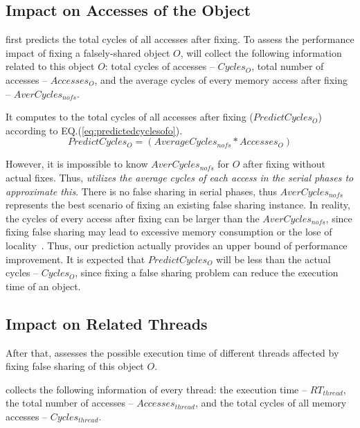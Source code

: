 \subsection{Impact on Accesses of the Object}
\label{sec:impactobject}

\cheetah{} first predicts the total cycles of all accesses after fixing. To assess the performance impact of fixing a falsely-shared object $O$, \cheetah{} will collect the following information related to this object $O$:  total cycles of accesses -- $Cycles_O$, total number of accesses -- $Accesses_O$, and the average cycles of every memory access after fixing -- $AverCycles_{nofs}$.

It computes to the total cycles of all accesses after fixing ($PredictCycles_{O}$) according to EQ.(\ref{eq:predictedcyclesofo}).   
\begin{equation}
\label{eq:predictedcyclesofo}
 PredictCycles_{O} = (AverageCycles_{nofs} * Accesses_O)
\end{equation} 

However, it is impossible to know $AverCycles_{nofs}$ for $O$ after fixing without actual fixes. Thus, {\it \cheetah{} utilizes the average cycles of each access in the serial phases to approximate this}. There is no false sharing in serial phases, thus $AverCycles_{nofs}$ represents the best scenario of fixing an existing false sharing instance. In reality, the cycles of every access after fixing can be larger than the $AverCycles_{nofs}$, since fixing false sharing may lead to excessive memory consumption or the lose of locality~\cite{qinzhao}. Thus, our prediction actually provides an upper bound of performance improvement. It is expected that $PredictCycles_{O}$ will be less than the actual cycles -- $Cycles_O$, since fixing a false sharing problem can reduce the execution time of an object.  
 
\subsection{Impact on Related Threads}
\label{sec:impactthread}

After that, \cheetah{} assesses the possible execution time of different threads affected by fixing false sharing of this object $O$. 

\Cheetah{} collects the following information of every thread: the execution time -- $RT_{thread}$, the total number of accesses -- $Accesses_{thread}$, and the total cycles of all memory accesses -- $Cycles_{thread}$.

